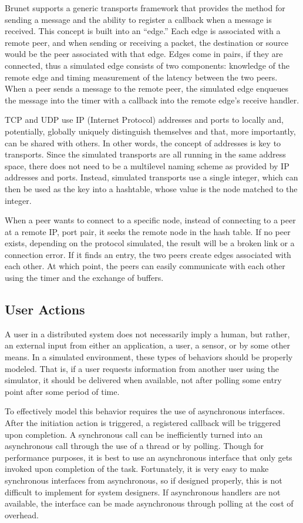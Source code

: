 Brunet supports a generic transports framework that provides the method for
sending a message and the ability to register a callback when a message is
received.  This concept is built into an ``edge.''  Each edge is associated
with a remote peer, and when sending or receiving a packet, the destination or
source would be the peer associated with that edge.  Edges come in pairs, if
they are connected, thus a simulated edge consists of two components: knowledge
of the remote edge and timing measurement of the latency between the two peers.
When a peer sends a message to the remote peer, the simulated edge enqueues the
message into the timer with a callback into the remote edge's receive handler.

TCP and UDP use IP (Internet Protocol) addresses and ports to locally and,
potentially, globally uniquely distinguish themselves and that, more
importantly, can be shared with others.  In other words, the concept of
addresses is key to transports.  Since the simulated transports are all running
in the same address space, there does not need to be a multilevel naming scheme
as provided by IP addresses and ports.  Instead, simulated transports use a
single integer, which can then be used as the key into a hashtable, whose value
is the node matched to the integer.

When a peer wants to connect to a specific node, instead of connecting to a
peer at a remote IP, port pair, it seeks the remote node in the hash table.  If
no peer exists, depending on the protocol simulated, the result will be a
broken link or a connection error.  If it finds an entry, the two peers create
edges associated with each other.  At which point, the peers can easily
communicate with each other using the timer and the exchange of buffers.

\subsection{User Actions}

A user in a distributed system does not necessarily imply a human, but rather,
an external input from either an application, a user, a sensor, or by some
other means.  In a simulated environment, these types of behaviors should be
properly modeled.  That is, if a user requests information from another user
using the simulator, it should be delivered when available, not after polling
some entry point after some period of time.

To effectively model this behavior requires the use of asynchronous interfaces.
After the initiation action is triggered, a registered callback will be
triggered upon completion.  A synchronous call can be inefficiently turned into
an asynchronous call through the use of a thread or by polling.  Though for
performance purposes, it is best to use an asynchronous interface that only
gets invoked upon completion of the task.  Fortunately, it is very easy to make
synchronous interfaces from asynchronous, so if designed properly, this is not
difficult to implement for system designers.  If asynchronous handlers are not
available, the interface can be made asynchronous through polling at the cost
of overhead.

